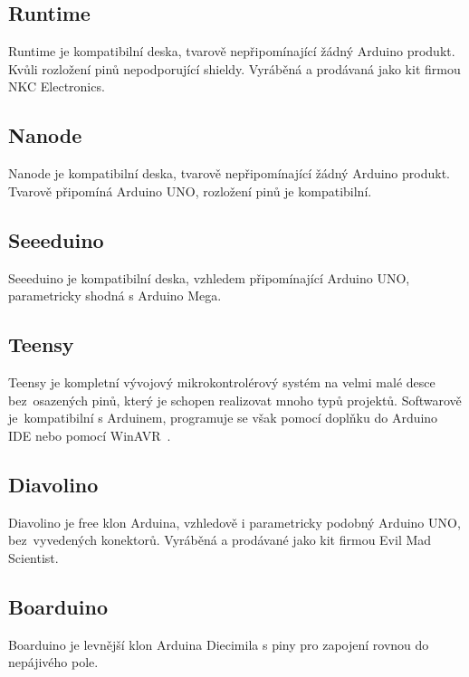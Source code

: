 	\subsection{Runtime} 
	Runtime je kompatibilní deska, tvarově nepřipomínající žádný Arduino produkt. Kvůli rozložení pinů nepodporující shieldy. Vyráběná a prodávaná jako kit firmou NKC Electronics.
	
	\subsection{Nanode} 
	Nanode je kompatibilní deska, tvarově nepřipomínající žádný Arduino produkt. Tvarově připomíná Arduino UNO, rozložení pinů je kompatibilní.
	
	\subsection{Seeeduino} 
	Seeeduino je kompatibilní deska, vzhledem připomínající Arduino UNO, parametricky shodná s Arduino Mega.
	
	\subsection{Teensy}
	Teensy je kompletní vývojový mikrokontrolérový systém na velmi malé desce bez~osazených pinů, který je schopen realizovat mnoho typů projektů. Softwarově je~kompatibilní s Arduinem, programuje se však pomocí doplňku do Arduino IDE nebo pomocí WinAVR~\cite{ArduinoTeensy}.
	
	\subsection{Diavolino} 
	Diavolino je free klon Arduina, vzhledově i parametricky podobný Arduino UNO, bez~vyvedených konektorů. Vyráběná a prodávané jako kit firmou Evil Mad Scientist.
		
	\subsection{Boarduino} 
	Boarduino je levnější klon Arduina Diecimila s piny pro zapojení rovnou do nepájivého pole.

